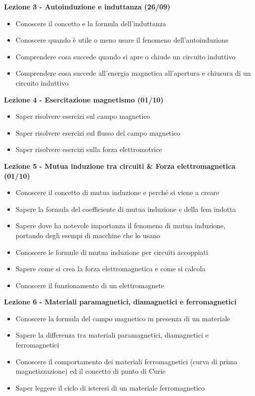 \documentclass{article}
\begin{document}
	\begin{center}
		\textbf{Lezione 3 - Autoinduzione e induttanza (26/09)}
		\begin{itemize}
			\item Conoscere il concetto e la formula dell'induttanza
			\item Conoscere quando è utile o meno usare il fenomeno dell'autoinduzione
			\item Comprendere cosa succede quando si apre o chiude un circuito induttivo
			\item Comprendere cosa succede all'energia magnetica all'apertura e chiusura di un circuito induttivo
		\end{itemize}
	\end{center}

	\begin{center}
		\textbf{Lezione 4 - Esercitazione magnetismo (01/10)}
		\begin{itemize}
			\item Saper risolvere esercizi sul campo magnetico
			\item Saper risolvere esercizi sul flusso del campo magnetico
			\item Saper risolvere esercizi sulla forza elettromotrice
		\end{itemize}
	\end{center}

	\begin{center}
		\textbf{Lezione 5 - Mutua induzione tra circuiti \& Forza elettromagnetica (01/10)}
		\begin{itemize}
			\item Conoscere il concetto di mutua induzione e perché si viene a creare
			\item Sapere la formula del coefficiente di mutua induzione e della fem indotta
			\item Sapere dove ha notevole importanza il fenomeno di mutua induzione, portando degli esempi di macchine che lo usano
			\item Conoscere le formule di mutua induzione per circuiti accoppiati
			\item Sapere come si crea la forza elettromagnetica e come si calcola
			\item Conoscere il funzionamento di un elettromagnete
		\end{itemize}
	\end{center}

	\begin{center}
		\textbf{Lezione 6 - Materiali paramagnetici, diamagnetici e ferromagnetici}
		\begin{itemize}
			\item Conoscere la formula del campo magnetico in presenza di un materiale
			\item Sapere la differenza tra materiali paramagnetici, diamagnetici e ferromagnetici
			\item Conoscere il comportamento dei materiali ferromagnetici (curva di prima magnetizzazione) ed il concetto di punto di Curie
			\item Saper leggere il ciclo di isteresi di un materiale ferromagnetico
		\end{itemize}
	\end{center}
\end{document}
